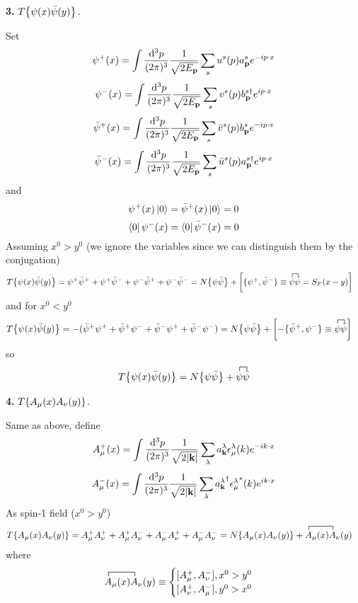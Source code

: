 \documentclass{article}
\newcommand{\vbp}{\vb{p}}
\newcommand{\vbk}{\vb{k}}
\newcommand{\la}{\lambda}
\newcommand{\N}[1]{N\Bqty{#1}}
\newcommand{\T}[1]{T\Bqty{#1}}
\begin{document}
{\bf3.}\quad
$T\Bqty{\psi(x)\bar\psi(y)}$.

Set
$$\psi^+(x)=\int\frac{\dd^3p}{(2\pi)^3}\frac{1}{\sqrt{2E_{\vbp}}}\sum_su^s(p)a^s_{\vbp}e^{-ip\cdot x}$$
$$\psi^-(x)=\int\frac{\dd^3p}{(2\pi)^3}\frac{1}{\sqrt{2E_{\vbp}}}\sum_sv^s(p)b^{s\dagger}_{\vbp}e^{ip\cdot x}$$
$$\bar\psi^+(x)=\int\frac{\dd^3p}{(2\pi)^3}\frac{1}{\sqrt{2E_{\vbp}}}\sum_s\bar v^s(p)b^s_{\vbp}e^{-ip\cdot x}$$
$$\bar\psi^-(x)=\int\frac{\dd^3p}{(2\pi)^3}\frac{1}{\sqrt{2E_{\vbp}}}\sum_s\bar u^s(p)a^{s\dagger}_{\vbp}e^{ip\cdot x}$$
and
$$\psi^+(x)\ket{0}=\bar\psi^+(x)\ket{0}=0$$
$$\bra{0}\psi^-(x)=\bra{0}\bar\psi^-(x)=0$$
Assuming $x^0>y^0$ (we ignore the variables since we can distinguish them by the conjugation)
\begin{align*}
  \T{\psi(x)\bar\psi(y)}&=\psi^+\bar\psi^++\psi^+\bar\psi^-+\psi^-\bar\psi^++\psi^-\bar\psi^-=\N{\psi\bar\psi}+\bqty{\{\psi^+,\bar\psi^-\}\equiv\contraction{}{\psi}{}{\bar\psi}\psi\bar\psi=S_F(x-y)}
\end{align*}
and for $x^0<y^0$
\begin{align*}
  \T{\psi(x)\bar\psi(y)}&=-(\bar\psi^+\psi^++\bar\psi^+\psi^-+\bar\psi^-\psi^++\bar\psi^-\psi^-)=\N{\psi\bar\psi}+\bqty{-\{\bar\psi^+,\psi^-\}\equiv\contraction{}{\psi}{}{\psi}\psi\bar\psi}
\end{align*}
so
$$\T{\psi(x)\bar\psi(y)}=\N{\psi\bar\psi}+\contraction{}{\psi}{}{\bar\psi}\psi\bar\psi$$

{\bf4.}\quad
$T\Bqty{A_{\mu}(x)A_{\nu}(y)}$.

Same as above, define
$$A_{\mu}^+(x)=\int\frac{\dd^3p}{(2\pi)^3}\frac{1}{\sqrt{2\abs{\vb{k}}}}\sum_{\la}a^{\la}_{\vbk}\epsilon^{\la}_{\mu}(k)e^{-ik\cdot x}$$
$$A_{\mu}^-(x)=\int\frac{\dd^3p}{(2\pi)^3}\frac{1}{\sqrt{2\abs{\vb{k}}}}\sum_{\la}{a^{\la}_{\vbk}}^{\dagger}{\epsilon^{\la}_{\mu}}^*(k)e^{ik\cdot x}$$
As spin-1 field ($x^0>y^0$)
\begin{align*}
  T\Bqty{A_{\mu}(x)A_{\nu}(y)}&=A_{\mu}^+A_{\nu}^++A_{\mu}^+A_{\nu}^-+A_{\mu}^-A_{\nu}^++A_{\mu}^-A_{\nu}^-=\N{A_{\mu}(x)A_{\nu}(y)}+\contraction{}{A}{_{\mu}(x)}{A} A_{\mu}(x)A_{\nu}(y)
\end{align*}
where
$$\contraction{}{A}{_{\mu}(x)}{A} A_{\mu}(x)A_{\nu}(y)\equiv\begin{cases}
[A_{\mu}^+,A_{\nu}^-],x^0>y^0\\
[A_{\nu}^+,A_{\mu}^-],y^0>x^0
\end{cases}$$
\end{document}
